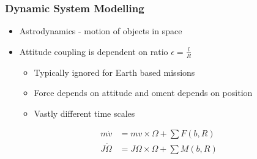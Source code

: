 \begin{frame}\label{slide:system_model_challenges}
\frametitle{Dynamic System Modelling}
\begin{itemize}
    \item Astrodynamics - motion of objects in space \hyperlink{astro}{}
    \pause
    \item Attitude coupling is dependent on ratio \( \epsilon = \frac{l}{R} \)
        \begin{itemize}
            \item Typically ignored for Earth based missions 
            \item Force depends on attitude and oment depends on position
            \item Vastly different time scales
        \end{itemize}
\end{itemize}
\begin{align*}
    m \dot{v} &= m v \times \Omega + \sum F(b, R) \\
    J \dot{\Omega}  &= J \Omega \times \Omega +  \sum M(b, R) 
\end{align*}


\end{frame}
